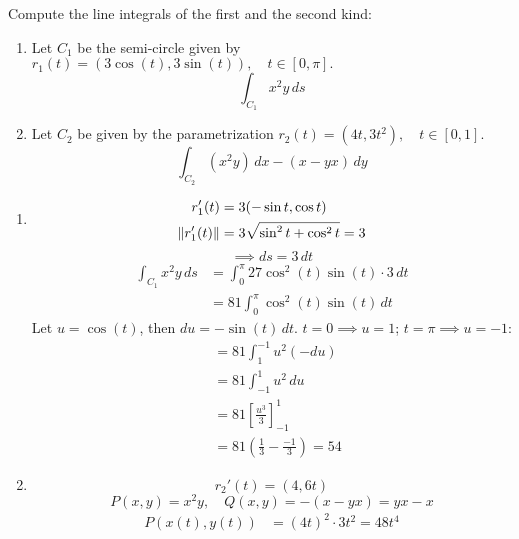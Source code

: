 \begin{exercise}
	Compute the line integrals of the first and the second kind:
	\begin{enumerate}
		\item Let $C_1$ be the semi-circle given by $ r_1(t) = (3 \cos(t), 3 \sin(t)), \quad t \in [0, \pi]. $
		      $$
			      \int_{C_1} x^2 y \, ds
		      $$
		\item Let $C_2$ be given by the parametrization $ r_2(t) = (4t, 3t^2), \quad t \in [0,1]. $
		      $$
			      \int_{C_2} (x^2 y) \, dx - (x - yx) \, dy
		      $$
	\end{enumerate}
\end{exercise}

\begin{solution}
	\begin{enumerate}
		\item
		      $$
			      \begin{aligned}
				      r_1'(t)        & = 3(-\sin t, \cos t)               \\
				      \norm{r_1'(t)} & = 3 \sqrt{\sin^2 t + \cos^2 t} = 3 \\
			      \end{aligned}
		      $$
		      $$
			      \implies ds = 3 \, dt
		      $$
		      $$
			      \begin{aligned}
				      \int_{C_1} x^2 y \, ds & = \int_0^\pi 27 \cos^2(t) \sin(t) \cdot 3 \, dt \\
				                             & = 81 \int_0^\pi \cos^2(t) \sin(t) \, dt
			      \end{aligned}
		      $$
		      Let $u = \cos(t)$, then $du = -\sin(t) \, dt$. $t = 0 \implies u = 1$; $t = \pi \implies u = -1$:
		      $$
			      \begin{aligned}
				       & = 81 \int_1^{-1} u^2(-du)                                \\
				       & = 81 \int_{-1}^1 u^2 \, du                               \\
				       & = 81 \left[ \frac{u^3}{3} \right]_{-1}^1                 \\
				       & = 81\left(\frac{1}{3} - \frac{-1}{3}\right) = \boxed{54}
			      \end{aligned}
		      $$
		\item
		      $$
			      r_2'(t) = (4, 6t)
		      $$
		      $$
			      P(x,y) = x^2y, \quad Q(x,y) = -(x - yx) = yx - x
		      $$
		      $$
			      \begin{aligned}
				      P(x(t), y(t)) & = (4t)^2 \cdot 3t^2 = 48t^4       \\

\end{aligned}$$
\end{enumerate}
\end{solution}
